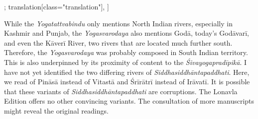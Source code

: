 \begin{alignment}[
  texts=edition[class="edition"];
  translation[class="translation"],
  ]
\begin{translation}
\begin{tlate}[p40_01]
{While the \emph{Yogatattvabindu} only mentions North Indian rivers, especially in Kashmir and Punjab, the \emph{Yogasvarodaya} also mentions Godā, today's Godāvarī, and even the Kāverī River, two rivers that are located much further south. Therefore, the \emph{Yogasvarodaya} was probably composed in South Indian territory. This is also underpinned by its proximity of content to the \emph{Śivayogapradīpikā}. I have not yet identified the two differing rivers of \emph{Siddhasiddhāntapaddhati}. Here, we read of Pināsā instead of Vitastā and Śrīrātrī instead of Irāvatī. It is possible that these variants of \emph{Siddhasiddhāntapaddhati} are corruptions. The Lonavla Edition offers no other convincing variants. The consultation of more manuscripts might reveal the original readings.\label{riversrivers}} 
  \flushpage
\end{tlate}
  \end{translation}
\end{alignment}
\pagebreak %
